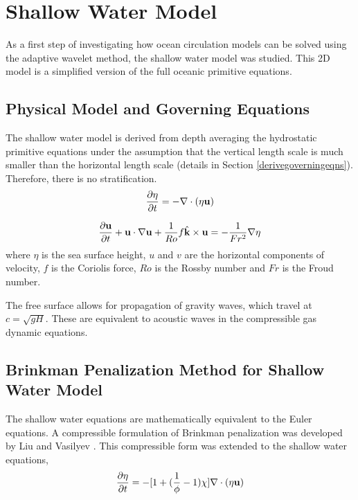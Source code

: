 \chapter[Shallow Water Model]{Shallow Water Model}
\label{chapter:3}

As a first step of investigating how ocean circulation models can be solved using the adaptive wavelet method, the shallow water model was studied.  This 2D model is a simplified version of the full oceanic primitive equations.  

\section{Physical Model and Governing Equations}

The shallow water model is derived from depth averaging the hydrostatic primitive equations under the assumption that the vertical length scale is much smaller than the horizontal length scale (details in Section \ref{derivegoverningeqns}).  Therefore, there is no stratification. 
%
\begin{equation}\label{e:swe_continuity}
\frac{\partial \eta}{\partial t} = -\nabla \cdot (\eta {\bf u})
\end{equation}

\begin{equation*} \label{e:swe_momentum}
\frac{\partial {\bf u}}{\partial t} + {\bf u} \cdot \nabla {\bf u} + \frac{1}{Ro} f \hat{\bf k} \times {\bf u} = - \frac{1}{Fr^2} \nabla \eta
\end{equation*}
%
where $\eta$ is the sea surface height, $u$ and $v$ are the horizontal components of velocity, $f$ is the Coriolis force, $Ro$ is the Rossby number and $Fr$ is the Froud number.  

The free surface allows for propagation of gravity waves, which travel at $c=\sqrt{gH}$.  These are equivalent to acoustic waves in the compressible gas dynamic equations.  

\section{Brinkman Penalization Method for Shallow Water Model}

The shallow water equations are mathematically equivalent to the Euler equations.  A compressible formulation of Brinkman penalization was developed by Liu and Vasilyev \cite{06LV}.  This compressible form was extended to the shallow water equations, 
%
\begin{equation}\label{e:swe_continuity_bp}
\frac{\partial \eta}{\partial t} = - [1+(\frac{1}{\phi}-1)\chi] \nabla \cdot (\eta {\bf u})
\end{equation}

